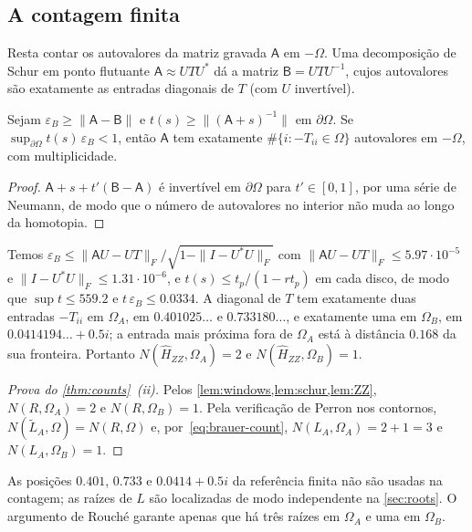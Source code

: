 \subsection{A contagem finita}\label{sec:counting-finite}

Resta contar os autovalores da matriz gravada $\mathsf A$ em $-\Omega$. Uma decomposição de Schur em ponto flutuante $\mathsf A\approx UTU^*$ dá a matriz $\mathsf B=UTU^{-1}$,
cujos autovalores são exatamente as entradas diagonais de $T$ (com $U$ invertível).

\begin{lemma}\label{lem:schur}
Sejam $\varepsilon_B\ge\|\mathsf A-\mathsf B\|$ e $t(s)\ge\|(\mathsf A+s)^{-1}\|$ em $\partial\Omega$. Se
$\sup_{\partial\Omega}t(s)\,\varepsilon_B<1$, então $\mathsf A$ tem exatamente $\#\{i:-T_{ii}\in\Omega\}$ autovalores
em $-\Omega$, com multiplicidade.
\end{lemma}

\begin{proof}
$\mathsf A+s+t'(\mathsf B-\mathsf A)$ é invertível em $\partial\Omega$ para $t'\in[0,1]$, por uma série de Neumann, de modo que o
número de autovalores no interior não muda ao longo da homotopia.
\end{proof}

Temos $\varepsilon_B\le\|\mathsf AU-UT\|_F/\sqrt{1-\|I-U^*U\|_F}$ com $\|\mathsf AU-UT\|_F\le5.97\cdot10^{-5}$ e
$\|I-U^*U\|_F\le1.31\cdot10^{-6}$, e $t(s)\le t_p/(1-rt_p)$ em cada disco, de modo que $\sup t\le559.2$ e
$t\,\varepsilon_B\le0.0334$. A diagonal de $T$ tem exatamente duas entradas $-T_{ii}$ em $\Omega_A$, em
$0.401025\ldots$ e $0.733180\ldots$, e exatamente uma em $\Omega_B$, em $0.0414194\ldots+0.5i$; a entrada mais próxima
fora de $\Omega_A$ está à distância $0.168$ da sua fronteira. Portanto $N(\widehat H_{ZZ},\Omega_A)=2$ e
$N(\widehat H_{ZZ},\Omega_B)=1$.

\begin{proof}[Prova do \cref{thm:counts}~(ii)]
Pelos \cref{lem:windows,lem:schur,lem:ZZ}, $N(R,\Omega_A)=2$ e $N(R,\Omega_B)=1$. Pela verificação de Perron nos
contornos, $N(\widetilde L_A,\Omega)=N(R,\Omega)$ e, por~\eqref{eq:brauer-count},
$N(L_A,\Omega_A)=2+1=3$ e $N(L_A,\Omega_B)=1$.
\end{proof}

As posições $0.401$, $0.733$ e $0.0414+0.5i$ da referência finita não são usadas na contagem; as raízes de
$L$ são localizadas de modo independente na \cref{sec:roots}. O argumento de Rouch\'e garante apenas que há três
raízes em $\Omega_A$ e uma em $\Omega_B$.
